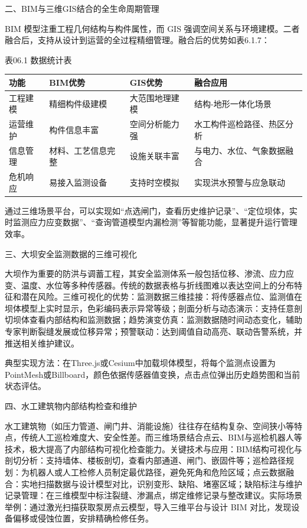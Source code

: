 二、BIM与三维GIS结合的全生命周期管理

BIM 模型注重工程几何结构与构件属性，而 GIS 强调空间关系与环境建模。二者融合后，支持从设计到运营的全过程精细管理。融合后的优势如表6.1.7：


表06.1 数据统计表

\begin{longtable}[]{@{}llll@{}}
\toprule\noalign{}
功能 & BIM优势 & GIS优势 & 融合应用 \\
\midrule\noalign{}
\endhead
\bottomrule\noalign{}
\endlastfoot
工程建模 & 精细构件级建模 & 大范围地理建模 & 结构-地形一体化场景 \\
运营维护 & 构件信息丰富 & 空间分析能力强 & 水工构件巡检路径、热区分析 \\
信息管理 & 材料、工艺信息完整 & 设施关联丰富 & 与电力、水位、气象数据融合 \\
危机响应 & 易接入监测设备 & 支持时空模拟 & 实现洪水预警与应急联动 \\
\end{longtable}

通过三维场景平台，可以实现如``点选闸门，查看历史维护记录''、``定位坝体，实时监测应力应变数据''、``查询管道模型内漏检测''等智能功能，显著提升运行管理效率。

三、大坝安全监测数据的三维可视化

大坝作为重要的防洪与调蓄工程，其安全监测体系一般包括位移、渗流、应力应变、温度、水位等多种传感器。传统的数据表格与折线图难以表达空间上的分布特征和潜在风险。三维可视化的优势：监测数据三维挂接：将传感器点位、监测值在坝体模型上实时显示，色彩编码表示异常等级；剖面分析与动态演示：支持任意剖切坝体查看内部结构和监测数据；趋势演变仿真：监测数据随时间动态变化，辅助专家判断裂缝发展或位移异常；预警联动：达到阈值自动高亮、联动告警系统，并推送相关维护建议。

典型实现方法：在Three.js或Cesium中加载坝体模型，将每个监测点设置为PointMesh或Billboard，颜色依据传感器值变换，点击点位弹出历史趋势图和当前状态评估。

四、水工建筑物内部结构检查和维护

水工建筑物（如压力管道、闸门井、消能设施）往往存在结构复杂、空间狭小等特点，传统人工巡检难度大、安全性差。而三维场景结合点云、BIM与巡检机器人等技术，极大提高了内部结构可视化检查能力。关键技术与应用：BIM结构可视化与剖切分析：支持墙体、楼板剖切，查看内部通道、闸门、嵌固件等；巡检路径规划：为机器人或人工检修人员制定最优路径，避免死角和危险区域；点云数据融合：实地扫描数据与设计模型对比，识别变形、缺陷、堵塞区域；缺陷标注与维护记录管理：在三维模型中标注裂缝、渗漏点，绑定维修记录与整改建议。实际场景举例：通过激光扫描获取泵房点云模型，导入三维平台与设计 BIM 对比，发现设备偏移或侵蚀位置，安排精确检修任务。


